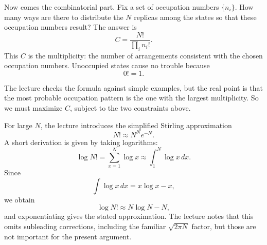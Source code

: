 Now comes the combinatorial part. Fix a set of occupation numbers \(\{n_i\}\). How many ways are there to distribute the \(N\) replicas among the states so that these occupation numbers result? The answer is
\begin{equation}
C=\frac{N!}{\prod_i n_i!}.
\end{equation}
This \(C\) is the multiplicity: the number of arrangements consistent with the chosen occupation numbers. Unoccupied states cause no trouble because
\begin{equation}
0!=1.
\end{equation}

The lecture checks the formula against simple examples, but the real point is that the most probable occupation pattern is the one with the largest multiplicity. So we must maximize \(C\), subject to the two constraints above.

For large \(N\), the lecture introduces the simplified Stirling approximation
\begin{equation}
N!\approx N^N e^{-N}.
\end{equation}
A short derivation is given by taking logarithms:
\begin{equation}
\log N! = \sum_{x=1}^N \log x \approx \int_1^N \log x\,dx.
\end{equation}
Since
\begin{equation}
\int \log x\,dx = x\log x-x,
\end{equation}
we obtain
\begin{equation}
\log N! \approx N\log N-N,
\end{equation}
and exponentiating gives the stated approximation. The lecture notes that this omits subleading corrections, including the familiar \(\sqrt{2\pi N}\) factor, but those are not important for the present argument.

